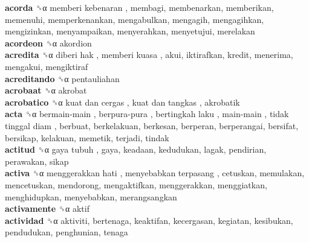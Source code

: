 \textbf{acorda} ␝α   memberi kebenaran , membagi, membenarkan, memberikan, memenuhi, memperkenankan, mengabulkan, mengagih, mengagihkan, mengizinkan, menyampaikan, menyerahkan, menyetujui, merelakan  \\
\textbf{acordeon} ␝α  akordion  \\
\textbf{acredita} ␝α   diberi hak ,  memberi kuasa , akui, iktirafkan, kredit, menerima, mengakui, mengiktiraf  \\
\textbf{acreditando} ␝α  pentauliahan  \\
\textbf{acrobaat} ␝α  akrobat  \\
\textbf{acrobatico} ␝α   kuat dan cergas ,  kuat dan tangkas , akrobatik  \\
\textbf{acta} ␝α   bermain-main ,  berpura-pura ,  bertingkah laku ,  main-main ,  tidak tinggal diam , berbuat, berkelakuan, berkesan, berperan, berperangai, bersifat, bersikap, kelakuan, memetik, terjadi, tindak  \\
\textbf{actitud} ␝α   gaya tubuh , gaya, keadaan, kedudukan, lagak, pendirian, perawakan, sikap  \\
\textbf{activa} ␝α   menggerakkan hati ,  menyebabkan terpasang , cetuskan, memulakan, mencetuskan, mendorong, mengaktifkan, menggerakkan, menggiatkan, menghidupkan, menyebabkan, merangsangkan  \\
\textbf{activamente} ␝α  aktif  \\
\textbf{actividad} ␝α  aktiviti, bertenaga, keaktifan, kecergasan, kegiatan, kesibukan, pendudukan, penghunian, tenaga  \\

